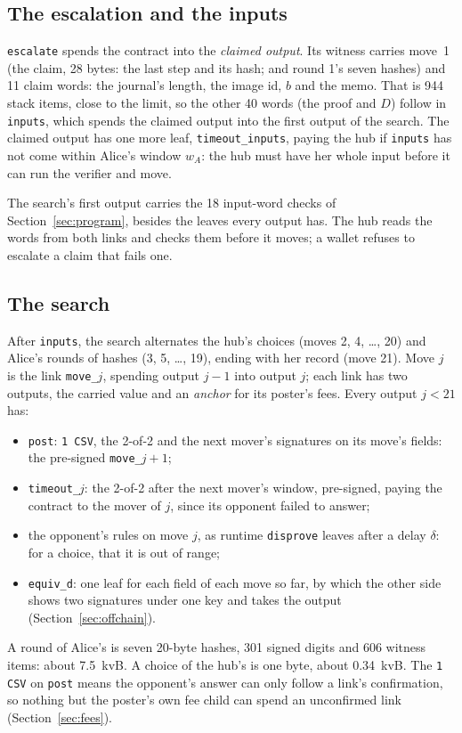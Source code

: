 \documentclass[11pt]{article}
\newcommand{\tx}[1]{\texttt{#1}}
\begin{document}
\subsection{The escalation and the inputs}
\label{sec:escalate}

\tx{escalate} spends the contract into the \emph{claimed output}. Its
witness carries move~1 (the claim, 28 bytes: the last step and its
hash; and round 1's seven hashes) and 11 claim words: the journal's
length, the image id, $b$ and the memo. That is 944 stack items, close
to the limit, so the other 40 words (the proof and $D$) follow in
\tx{inputs}, which spends the claimed output into the first output of
the search. The claimed output has one more leaf, \tx{timeout\_inputs},
paying the hub if \tx{inputs} has not come within Alice's window $w_A$:
the hub must have her whole input before it can run the verifier and
move.

The search's first output carries the 18 input-word checks of
Section~\ref{sec:program}, besides the leaves every output has. The hub
reads the words from both links and checks them before it moves; a
wallet refuses to escalate a claim that fails one.

\subsection{The search}
\label{sec:ladder}

After \tx{inputs}, the search alternates the hub's choices (moves 2, 4,
\ldots, 20) and Alice's rounds of hashes (3, 5, \ldots, 19), ending with
her record (move 21). Move $j$ is the link \tx{move\_$j$}, spending
output $j-1$ into output $j$; each link has two outputs, the carried
value and an \emph{anchor} for its poster's fees. Every output $j < 21$
has:
\begin{itemize}[leftmargin=1.5em]
\item \tx{post}: \texttt{1 CSV}, the 2-of-2 and the next mover's
  signatures on its move's fields: the pre-signed \tx{move\_$j{+}1$};
\item \tx{timeout\_$j$}: the 2-of-2 after the next mover's window,
  pre-signed, paying the contract to the mover of $j$, since its
  opponent failed to answer;
\item the opponent's rules on move $j$, as runtime \tx{disprove} leaves
  after a delay $\delta$: for a choice, that it is out of range;
\item \tx{equiv\_d}: one leaf for each field of each move so far, by
  which the other side shows two signatures under one key and takes the
  output (Section~\ref{sec:offchain}).
\end{itemize}
A round of Alice's is seven 20-byte hashes, 301 signed digits and 606
witness items: about 7.5~kvB. A choice of the hub's is one byte, about
0.34~kvB. The \texttt{1 CSV} on \tx{post} means the opponent's answer
can only follow a link's confirmation, so nothing but the poster's own
fee child can spend an unconfirmed link (Section~\ref{sec:fees}).
\end{document}
